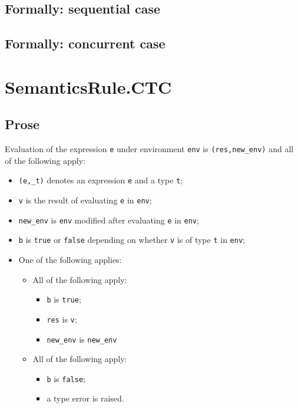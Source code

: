 \documentclass{book}
\begin{document}
\begin{emptyformal}
  \subsection{Formally: sequential case}

  \subsection{Formally: concurrent case}
\end{emptyformal}


\section{SemanticsRule.CTC \label{sec:SemanticsRule.CTC}}

  \subsection{Prose}
  Evaluation of the expression \texttt{e} under environment \texttt{env} is
  \texttt{(res,new\_env)} and all of the following apply:
  \begin{itemize}
  \item \texttt{(e,\_t)} denotes an expression \texttt{e} and a type \texttt{t};
  \item \texttt{v} is the result of evaluating \texttt{e} in \texttt{env};
  \item \texttt{new\_env} is \texttt{env} modified after evaluating \texttt{e} in \texttt{env};
  \item \texttt{b} is \texttt{true} or \texttt{false} depending on whether \texttt{v} is of type \texttt{t} in \texttt{env};
  \item One of the following applies:
        \begin{itemize}
        \item All of the following apply:
              \begin{itemize}
              \item \texttt{b} is \texttt{true};
              \item \texttt{res} is \texttt{v};
              \item \texttt{new\_env} is \texttt{new\_env}
              \end{itemize} 
        \item All of the following apply:
              \begin{itemize}
              \item \texttt{b} is \texttt{false};
              \item a type error is raised. 
              \end{itemize} 
        \end{itemize}   
  \end{itemize} 
\end{document}

